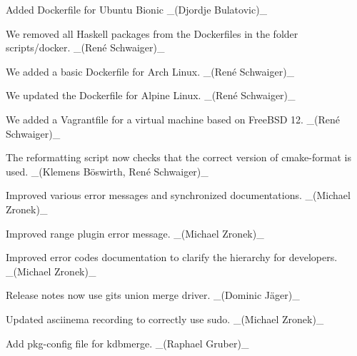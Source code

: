 \begin{DoxyItemize}
\item Added Dockerfile for Ubuntu Bionic \+\_\+(\+Djordje Bulatovic)\+\_\+
\item We removed all Haskell packages from the Dockerfiles in the folder scripts/docker. \+\_\+(René Schwaiger)\+\_\+
\item We added a basic Dockerfile for Arch Linux. \+\_\+(René Schwaiger)\+\_\+
\item We updated the Dockerfile for Alpine Linux. \+\_\+(René Schwaiger)\+\_\+
\end{DoxyItemize}


\begin{DoxyItemize}
\item We added a Vagrantfile for a virtual machine based on Free\+B\+SD 12. \+\_\+(René Schwaiger)\+\_\+
\end{DoxyItemize}


\begin{DoxyItemize}
\item The reformatting script now checks that the correct version of {\ttfamily cmake-\/format} is used. \+\_\+(Klemens Böswirth, René Schwaiger)\+\_\+
\item Improved various error messages and synchronized documentations. \+\_\+(\+Michael Zronek)\+\_\+
\item Improved {\ttfamily range} plugin error message. \+\_\+(\+Michael Zronek)\+\_\+
\item Improved error codes documentation to clarify the hierarchy for developers. \+\_\+(\+Michael Zronek)\+\_\+
\item Release notes now use git\textquotesingle{}s union merge driver. \+\_\+(Dominic Jäger)\+\_\+
\item Updated asciinema recording to correctly use {\ttfamily sudo}. \+\_\+(\+Michael Zronek)\+\_\+
\item Add pkg-\/config file for kdbmerge. \+\_\+(\+Raphael Gruber)\+\_\+
\end{DoxyItemize}


